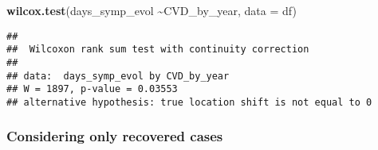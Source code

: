 \documentclass[
]{article}
\newenvironment{Shaded}{\begin{snugshade}}{\end{snugshade}}
\newcommand{\AttributeTok}[1]{\textcolor[rgb]{0.13,0.29,0.53}{#1}}
\newcommand{\FunctionTok}[1]{\textcolor[rgb]{0.13,0.29,0.53}{\textbf{#1}}}
\newcommand{\NormalTok}[1]{#1}
\newcommand{\OtherTok}[1]{\textcolor[rgb]{0.56,0.35,0.01}{#1}}
\newcommand{\SpecialCharTok}[1]{\textcolor[rgb]{0.81,0.36,0.00}{\textbf{#1}}}
\newcommand{\StringTok}[1]{\textcolor[rgb]{0.31,0.60,0.02}{#1}}
\begin{document}
\begin{Shaded}
\begin{Highlighting}[]
\FunctionTok{wilcox.test}\NormalTok{(days\_symp\_evol }\SpecialCharTok{\textasciitilde{}}\NormalTok{CVD\_by\_year, }\AttributeTok{data =}\NormalTok{ df)}
\end{Highlighting}
\end{Shaded}

\begin{verbatim}
## 
##  Wilcoxon rank sum test with continuity correction
## 
## data:  days_symp_evol by CVD_by_year
## W = 1897, p-value = 0.03553
## alternative hypothesis: true location shift is not equal to 0
\end{verbatim}

\hypertarget{considering-only-recovered-cases}{%
\subsubsection{Considering only recovered
cases}\label{considering-only-recovered-cases}}

\begin{Shaded}
\end{Shaded}
\end{document}
